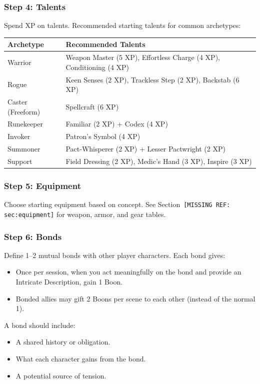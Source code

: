 \subsubsection{Step 4: Talents}
Spend XP on talents. Recommended starting talents for common archetypes:

\begin{tabular}{@{}ll@{}}
\toprule
\textbf{Archetype} & \textbf{Recommended Talents} \\
\midrule
Warrior & Weapon Master (5 XP), Effortless Charge (4 XP), Conditioning (4 XP) \\
Rogue & Keen Senses (2 XP), Trackless Step (2 XP), Backstab (6 XP) \\
Caster (Freeform) & Spellcraft (6 XP) \\
Runekeeper & Familiar (2 XP) + Codex (4 XP) \\
Invoker & Patron's Symbol (4 XP) \\
Summoner & Pact-Whisperer (2 XP) + Lesser Pactwright (2 XP) \\
Support & Field Dressing (2 XP), Medic's Hand (3 XP), Inspire (3 XP) \\
\bottomrule
\end{tabular}

\subsubsection{Step 5: Equipment}
Choose starting equipment based on concept. See Section~\texttt{[MISSING REF: sec:equipment]} for weapon, armor, and gear tables.

\subsubsection{Step 6: Bonds}
Define 1--2 mutual bonds with other player characters. Each bond gives:

\begin{itemize}
  \item Once per session, when you act meaningfully on the bond and provide an Intricate Description, gain 1 Boon.
  \item Bonded allies may gift 2 Boons per scene to each other (instead of the normal 1).
\end{itemize}

A bond should include:
\begin{itemize}
  \item A shared history or obligation.
  \item What each character gains from the bond.
  \item A potential source of tension.
\end{itemize}

